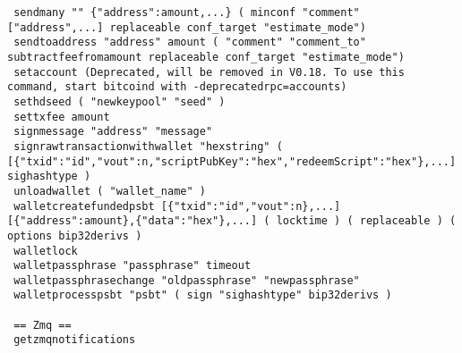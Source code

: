 \begin{lstlisting}
 sendmany "" {"address":amount,...} ( minconf "comment" ["address",...] replaceable conf_target "estimate_mode")
 sendtoaddress "address" amount ( "comment" "comment_to" subtractfeefromamount replaceable conf_target "estimate_mode")
 setaccount (Deprecated, will be removed in V0.18. To use this command, start bitcoind with -deprecatedrpc=accounts)
 sethdseed ( "newkeypool" "seed" )
 settxfee amount
 signmessage "address" "message"
 signrawtransactionwithwallet "hexstring" ( [{"txid":"id","vout":n,"scriptPubKey":"hex","redeemScript":"hex"},...] sighashtype )
 unloadwallet ( "wallet_name" )
 walletcreatefundedpsbt [{"txid":"id","vout":n},...] [{"address":amount},{"data":"hex"},...] ( locktime ) ( replaceable ) ( options bip32derivs )
 walletlock
 walletpassphrase "passphrase" timeout
 walletpassphrasechange "oldpassphrase" "newpassphrase"
 walletprocesspsbt "psbt" ( sign "sighashtype" bip32derivs )

 == Zmq ==
 getzmqnotifications
\end{lstlisting}


